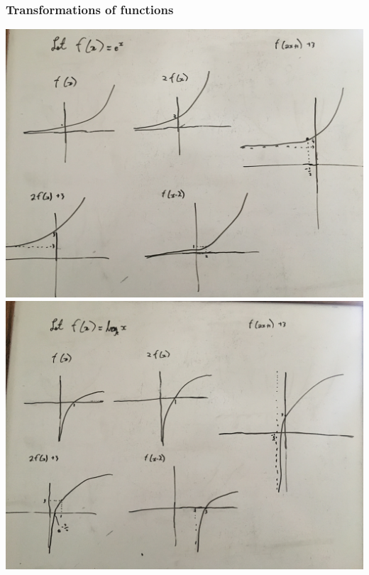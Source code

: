 \documentclass{article}
\begin{document}
\subsubsection{Transformations of functions}
\includegraphics[scale=0.1]{media/Exponential_graphs}
\newline
\includegraphics[scale=0.1]{media/Log_graphs}
\end{document}
